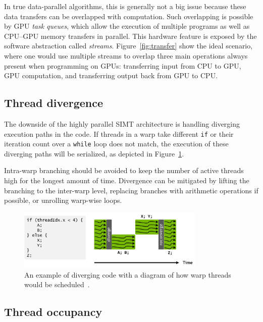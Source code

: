 In true data-parallel algorithms, this is generally not a big issue because these data transfers can be overlapped with computation. Such overlapping is possible by GPU \emph{task queues}, which allow the execution of multiple programs as well as CPU--GPU memory transfers in parallel. This hardware feature is exposed by the software abstraction called \emph{streams}. Figure~\ref{fig:transfer} show the ideal scenario, where one would use multiple streams to overlap three main operations always present when programming on GPUs: transferring input from CPU to GPU, GPU computation, and transferring output back from GPU to CPU.

\subsection{Thread divergence}
\label{sec:divergence}

The downside of the highly parallel SIMT architecture is handling diverging execution paths in the code. If threads in a warp take different \texttt{if} or their iteration count over a \texttt{while} loop does not match, the execution of these diverging paths will be serialized, as depicted in Figure~\ref{fig:divergence}.

Intra-warp branching should be avoided to keep the number of active threads high for the longest amount of time. Divergence can be mitigated by lifting the branching to the inter-warp level, replacing branches with arithmetic operations if possible, or unrolling warp-wise loops.

\begin{figure}
    \centering
    \includegraphics[width=0.8\textwidth]{img/divergence.png}
    \caption{An example of diverging code with a diagram of how warp threads would be scheduled~\cite{site:volta}.}
    \label{fig:divergence}
\end{figure}

\subsection{Thread occupancy}
\label{sec:occupancy}


